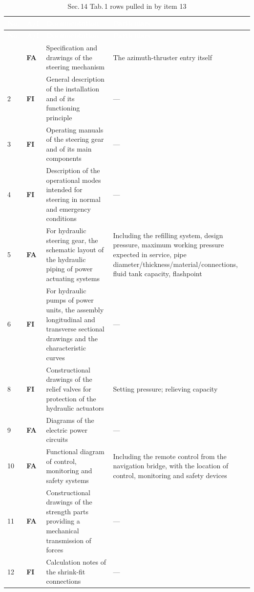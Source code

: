 \documentclass[11pt,a4paper]{report}
\newcommand{\fa}{\textbf{\textcolor{warningred}{FA}}}
\newcommand{\fic}{\textbf{\textcolor{bvgray}{FI}}}
\begin{document}
\vspace{3mm}
\begin{longtable}{|p{0.7cm}|p{1.1cm}|p{5.8cm}|p{6.4cm}|}
\caption{Sec.\,14 Tab.\,1 rows pulled in by item 13} \label{tab:s14sub} \\
\hline
\rowcolor{bvblue}
\textcolor{white}{\textbf{No.}} & \textcolor{white}{\textbf{A/I}} & \textcolor{white}{\textbf{Documentation}} & \textcolor{white}{\textbf{Particulars}} \\
\hline
\endfirsthead
\hline
\rowcolor{bvblue}
\textcolor{white}{\textbf{No.}} & \textcolor{white}{\textbf{A/I}} & \textcolor{white}{\textbf{Documentation}} & \textcolor{white}{\textbf{Particulars}} \\
\hline
\endhead
\hline
\endlastfoot
13 & \fa{} & Specification and drawings of the steering mechanism & The azimuth-thruster entry itself \\
\hline
2 & \fic{} & General description of the installation and of its functioning principle & --- \\
\hline
3 & \fic{} & Operating manuals of the steering gear and of its main components & --- \\
\hline
4 & \fic{} & Description of the operational modes intended for steering in normal and emergency conditions & --- \\
\hline
5 & \fa{} & For hydraulic steering gear, the schematic layout of the hydraulic piping of power actuating systems & Including the refilling system, design pressure, maximum working pressure expected in service, pipe diameter/thickness/material/connections, fluid tank capacity, flashpoint \\
\hline
6 & \fic{} & For hydraulic pumps of power units, the assembly longitudinal and transverse sectional drawings and the characteristic curves & --- \\
\hline
8 & \fic{} & Constructional drawings of the relief valves for protection of the hydraulic actuators & Setting pressure; relieving capacity \\
\hline
9 & \fa{} & Diagrams of the electric power circuits & --- \\
\hline
10 & \fa{} & Functional diagram of control, monitoring and safety systems & Including the remote control from the navigation bridge, with the location of control, monitoring and safety devices \\
\hline
11 & \fa{} & Constructional drawings of the strength parts providing a mechanical transmission of forces & --- \\
\hline
12 & \fic{} & Calculation notes of the shrink-fit connections & --- \\
\hline
\end{longtable}
\end{document}
